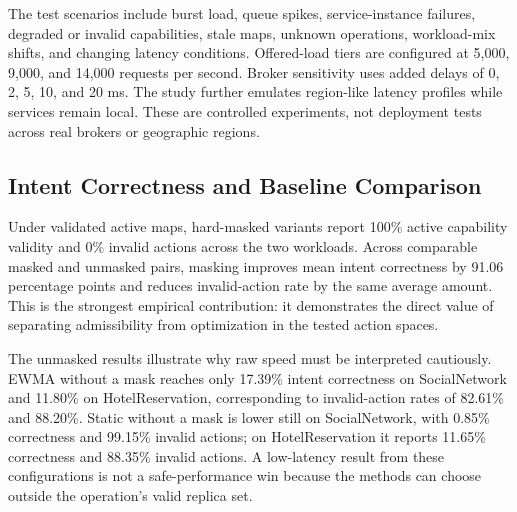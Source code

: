 \documentclass[conference]{IEEEtran}
\begin{document}
The test scenarios include burst load, queue spikes, service-instance failures, degraded or invalid capabilities, stale maps, unknown operations, workload-mix shifts, and changing latency conditions. Offered-load tiers are configured at 5,000, 9,000, and 14,000 requests per second. Broker sensitivity uses added delays of 0, 2, 5, 10, and 20 ms. The study further emulates region-like latency profiles while services remain local. These are controlled experiments, not deployment tests across real brokers or geographic regions.

\subsection{Intent Correctness and Baseline Comparison}
Under validated active maps, hard-masked variants report 100\% active capability validity and 0\% invalid actions across the two workloads. Across comparable masked and unmasked pairs, masking improves mean intent correctness by 91.06 percentage points and reduces invalid-action rate by the same average amount. This is the strongest empirical contribution: it demonstrates the direct value of separating admissibility from optimization in the tested action spaces.

The unmasked results illustrate why raw speed must be interpreted cautiously. EWMA without a mask reaches only 17.39\% intent correctness on SocialNetwork and 11.80\% on HotelReservation, corresponding to invalid-action rates of 82.61\% and 88.20\%. Static without a mask is lower still on SocialNetwork, with 0.85\% correctness and 99.15\% invalid actions; on HotelReservation it reports 11.65\% correctness and 88.35\% invalid actions. A low-latency result from these configurations is not a safe-performance win because the methods can choose outside the operation's valid replica set.
\end{document}
